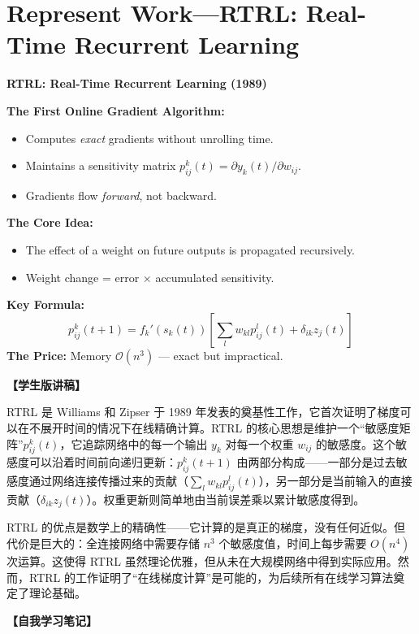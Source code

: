 \documentclass[journal,12pt,onecolumn]{IEEEtran}
\begin{document}
\section{Represent Work—RTRL: Real-Time Recurrent Learning}

\bigskip\noindent\textbf{RTRL: Real-Time Recurrent Learning (1989)}\par\smallskip
\textbf{The First Online Gradient Algorithm:}
\begin{itemize}
    \item Computes \textit{exact} gradients without unrolling time.
    \item Maintains a sensitivity matrix $p_{ij}^k(t) = \partial y_k(t)/\partial w_{ij}$.
    \item Gradients flow \textit{forward}, not backward.
\end{itemize}
\textbf{The Core Idea:}
\begin{itemize}
    \item The effect of a weight on future outputs is propagated recursively.
    \item Weight change = error $\times$ accumulated sensitivity.
\end{itemize}
\textbf{Key Formula:}
\begin{equation}
    p_{ij}^{k}(t+1) = f_k'(s_k(t)) \left[ \sum_l w_{kl} p_{ij}^{l}(t) + \delta_{ik} z_j(t) \right]
\end{equation}
\textbf{The Price:} Memory $\mathcal{O}(n^3)$ — exact but impractical.

\textbf{【学生版讲稿】}

RTRL 是 Williams 和 Zipser 于 1989 年发表的奠基性工作，它首次证明了梯度可以在不展开时间的情况下在线精确计算。RTRL 的核心思想是维护一个“敏感度矩阵”$p_{ij}^{k}(t)$，它追踪网络中的每一个输出 $y_k$ 对每一个权重 $w_{ij}$ 的敏感度。这个敏感度可以沿着时间前向递归更新：$p_{ij}^{k}(t+1)$ 由两部分构成——一部分是过去敏感度通过网络连接传播过来的贡献（$\sum_l w_{kl} p_{ij}^{l}(t)$），另一部分是当前输入的直接贡献（$\delta_{ik} z_j(t)$）。权重更新则简单地由当前误差乘以累计敏感度得到。

RTRL 的优点是数学上的精确性——它计算的是真正的梯度，没有任何近似。但代价是巨大的：全连接网络中需要存储 $n^3$ 个敏感度值，时间上每步需要 $O(n^4)$ 次运算。这使得 RTRL 虽然理论优雅，但从未在大规模网络中得到实际应用。然而，RTRL 的工作证明了“在线梯度计算”是可能的，为后续所有在线学习算法奠定了理论基础。

\bigskip\noindent\textbf{【自我学习笔记】}
\end{document}
